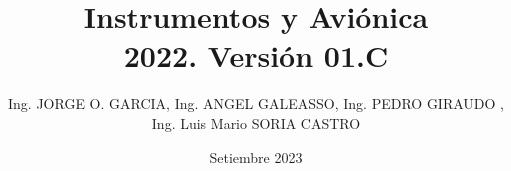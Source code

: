 \documentclass[a4page,12pt,twoside, spanish]{book}
\title{Instrumentos y Avi\'onica \\ 2022. Versi\'on 01.C}
\author{Ing. JORGE O. GARCIA, Ing. ANGEL GALEASSO, Ing. PEDRO GIRAUDO , Ing. Luis Mario SORIA CASTRO}
\date{Setiembre 2023}
\begin{document}
\renewcommand{\listtablename}{\'Indice de tablas} 
\renewcommand{\tablename}{Tabla}  %

\renewcommand{\appendixtocname}{Ap\'endices}
\renewcommand{\appendixpagename}{Ap\'endices}

\renewcommand{\baselinestretch}{1.5}       %

\setlength{\parindent}{0pt}      %

\clearpage
\thispagestyle{fancy}

\maketitle

\tableofcontents





















\clearpage	%
\printacronyms[name = Acr\'onimos, heading = chapter*]


\clearpage
\printglossaries	%

\clearpage


\clearpage
\renewcommand\bibname{Bibliograf\'ia} %



%


%
%

\begin{appendices}

%
%

\end{appendices}
\end{document}
